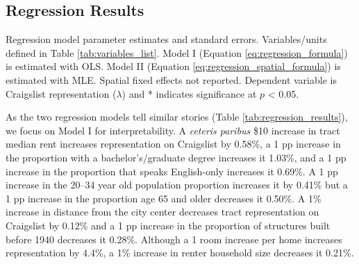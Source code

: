 \documentclass[11pt,letterpaper]{article}
\begin{document}
\subsection{Regression Results}

\begin{table}[tb]
	\centering
	\small
	\caption{Regression model parameter estimates and standard errors. Variables/units defined in Table \ref{tab:variables_list}. Model I (Equation \ref{eq:regression_formula}) is estimated with OLS. Model II (Equation \ref{eq:regression_spatial_formula}) is estimated with MLE. Spatial fixed effects not reported. Dependent variable is Craigslist representation ($\lambda$) and * indicates significance at $p$ < 0.05.}
	\label{tab:regression_results}
	
\end{table}

As the two regression models tell similar stories (Table \ref{tab:regression_results}), we focus on Model I for interpretability. A \textit{ceteris paribus} \$10 increase in tract median rent increases representation on Craigslist by 0.58\%, a 1 pp increase in the proportion with a bachelor's/graduate degree increases it 1.03\%, and a 1 pp increase in the proportion that speaks English-only increases it 0.69\%. A 1 pp increase in the 20--34 year old population proportion increases it by 0.41\% but a 1 pp increase in the proportion age 65 and older decreases it 0.50\%. A 1\% increase in distance from the city center decreases tract representation on Craigslist by 0.12\% and a 1 pp increase in the proportion of structures built before 1940 decreases it 0.28\%. Although a 1 room increase per home increases representation by 4.4\%, a 1\% increase in renter household size decreases it 0.21\%.
\end{document}
